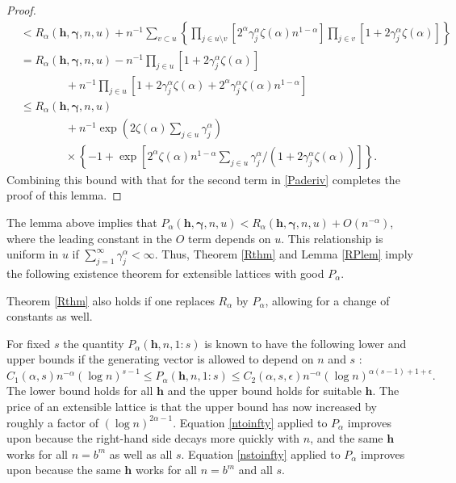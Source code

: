 \documentclass{article}
\renewcommand{\vec}[1]{\ensuremath{\mathbf{#1}}}
\newcommand{\vecsym}[1]{\ensuremath{\boldsymbol{#1}}}
\newcommand{\bfgam}{\vecsym \gamma}
\newcommand{\h}{\vec h}
\begin{document}
\begin{proof}
\begin{align*}
    & < R_{\alpha}(\h,\bfgam,n,u) + n^{-1}\sum_{v \subset u} \left\{
    \prod_{j \in u \setminus v}[2^{\alpha}
    \gamma_{j}^{\alpha}\zeta(\alpha)n^{1-\alpha} ] \prod_{j \in v} [1 + 2
    \gamma_{j}^{\alpha} \zeta(\alpha)] \right\} \\
    &= R_{\alpha}(\h,\bfgam,n,u) - n^{-1} \prod_{j \in u}[1 + 2
    \gamma_{j}^{\alpha} \zeta(\alpha)] \\
    & \qquad \qquad + n^{-1} \prod_{j \in u}[1 + 2
    \gamma_{j}^{\alpha} \zeta(\alpha) + 2^{\alpha}
    \gamma_{j}^{\alpha}\zeta(\alpha)n^{1-\alpha} ] \\
    &\le R_{\alpha}(\h,\bfgam,n,u) \\
    &\qquad \qquad + n^{-1} \exp\left( 2 \zeta(\alpha) \sum_{j \in u}
    \gamma^{\alpha}_{j} \right) \\
    & \qquad \qquad \times \left\{-1 + \exp\left[ 2^{\alpha}
    \zeta(\alpha)n^{1-\alpha} \sum_{j \in u} \gamma^{\alpha}_{j}/(1 +
    2 \gamma_{j}^{\alpha} \zeta(\alpha)) \right] \right\}.
\end{align*}
Combining this bound with that for the second term in \eqref{Paderiv} 
completes the proof of this lemma.
\end{proof}

The lemma above implies that $P_{\alpha}(\h,\bfgam,n,u) <
R_{\alpha}(\h,\bfgam,n,u) + O(n^{-\alpha})$, where the leading
constant in the $O$ term depends on $u$.  This relationship is uniform
in $u$ if $\sum_{j=1}^{\infty} \gamma^{\alpha}_{j} < \infty$.  Thus,
Theorem \ref{Rthm} and Lemma \ref{RPlem} imply the following existence
theorem for extensible lattices with good $P_{\alpha}$.

\begin{theorem} \label{Pthm} Theorem \ref{Rthm} also holds if one
replaces $R_{\alpha}$ by $P_{\alpha}$, allowing for a change of
constants as well.
\end{theorem}

For fixed $s$ the quantity $P_{\alpha}(\h,n,1:s)$ is known to have the
following lower and upper bounds if the generating vector is allowed
to depend on $n$ and $s$ \cite{Nie93a,Sha63}:
$$
C_{1}(\alpha,s) n^{-\alpha} (\log n)^{s-1} \le
P_{\alpha}(\h,n,1:s) \le C_{2}(\alpha,s,\epsilon) n^{-\alpha} (\log 
n)^{\alpha(s-1)+1 + \epsilon}.
$$
The lower bound holds for all $\h$ and the upper bound holds for suitable
$\h$. The price of an extensible lattice is that the upper bound has now
increased by roughly a factor of $(\log n)^{2\alpha -1}$.  Equation
\eqref{ntoinfty} applied to $P_{\alpha}$ improves upon \cite[Theorem
2.1]{SloRez01} because the right-hand side decays more quickly with $n$,
and the same $\h$ works for all $n=b^{m}$ as well as all $s$. 
Equation \eqref{nstoinfty} applied to $P_{\alpha}$ improves upon
\cite[Theorem 3]{SloWoz00a} because the same $\h$ works for all
$n=b^{m}$ and all $s$.
\end{document}
